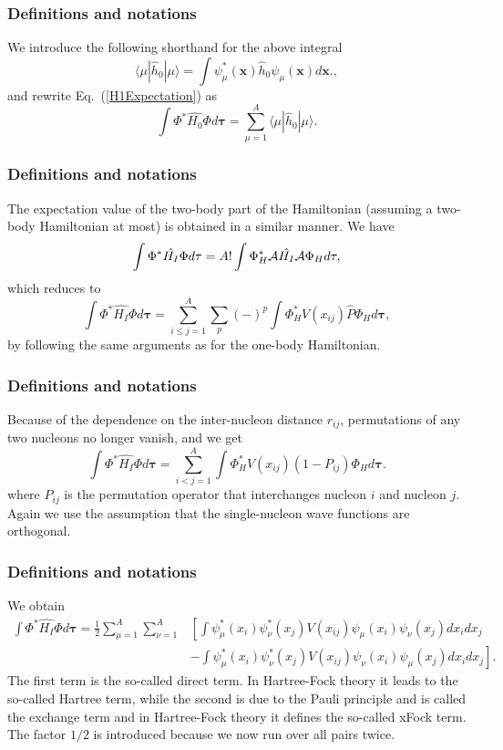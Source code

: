 \documentclass[compress]{beamer}
\begin{document}
\frame
{
  \frametitle{Definitions and notations}
\begin{small}
{\scriptsize
We introduce the following shorthand for the above integral
\[
\langle \mu | \hat{h}_0 | \mu \rangle = \int \psi_{\mu}^*(\mathbf{x})\hat{h}_0\psi_{\mu}(\mathbf{x})d\mathbf{x}.,
\]
and rewrite Eq.~(\ref{H1Expectation}) as
\begin{equation}
  \int \Phi^*\hat{H_0}\Phi  d\mathbf{\tau}
  = \sum_{\mu=1}^A \langle \mu | \hat{h}_0 | \mu \rangle.
  \label{H1Expectation1}
\end{equation}

}
\end{small}
}
\frame
{
  \frametitle{Definitions and notations}
\begin{small}
{\scriptsize
The expectation value of the two-body part of the Hamiltonian (assuming a two-body Hamiltonian at most) is obtained in a
similar manner. We have
\begin{equation*}
  \int \Phi^*\hat{H_I}\Phi d\mathbf{\tau} 
  = A! \int \Phi_H^*{\cal A}\hat{H_I}{\cal A}\Phi_H d\mathbf{\tau},
\end{equation*}
which reduces to
\begin{equation*}
 \int \Phi^*\hat{H_I}\Phi d\mathbf{\tau} 
  = \sum_{i\le j=1}^A \sum_{p} (-)^p\int 
  \Phi_H^*V(x_{ij})\hat{P}\Phi_H d\mathbf{\tau},
\end{equation*}
by following the same arguments as for the one-body
Hamiltonian. 
}
\end{small}
}
\frame
{
  \frametitle{Definitions and notations}
\begin{small}
{\scriptsize
Because of the dependence on the inter-nucleon distance $r_{ij}$,  permutations of
any two nucleons no longer vanish, and we get
\begin{equation*}
  \int \Phi^*\hat{H_I}\Phi d\mathbf{\tau} 
  = \sum_{i < j=1}^A \int  
  \Phi_H^*V(x_{ij})(1-P_{ij})\Phi_H d\mathbf{\tau}.
\end{equation*}
where $P_{ij}$ is the permutation operator that interchanges
nucleon $i$ and nucleon $j$. Again we use the assumption that the single-nucleon wave functions
are orthogonal. 
}
\end{small}
}
\frame
{
  \frametitle{Definitions and notations}
\begin{small}
{\scriptsize
We obtain
\begin{equation}
\begin{split}
  \int \Phi^*\hat{H_I}\Phi d\mathbf{\tau} 
  = \frac{1}{2}\sum_{\mu=1}^A\sum_{\nu=1}^A
    &\left[ \int \psi_{\mu}^*(x_i)\psi_{\nu}^*(x_j)V(x_{ij})\psi_{\mu}(x_i)\psi_{\nu}(x_j)
    dx_idx_j \right.\\
  &\left.
  - \int \psi_{\mu}^*(x_i)\psi_{\nu}^*(x_j)
  V(x_{ij})\psi_{\nu}(x_i)\psi_{\mu}(x_j)
  dx_idx_j
  \right]. \label{H2Expectation}
\end{split}
\end{equation}
The first term is the so-called direct term. In Hartree-Fock theory it leads to the so-called Hartree term, 
while the second is due to the Pauli principle and is called
the exchange term and in Hartree-Fock theory it defines the so-called xFock term.
The factor  $1/2$ is introduced because we now run over
all pairs twice. 
}
\end{small}
}
\end{document}
